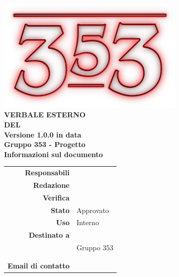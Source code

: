 \documentclass[openany, a4paper, 12pt]{report}
\begin{document}
\begin{titlepage}
	\centering
	\vfill
	{
		\bfseries
		\vskip2cm
		\includegraphics[width=9cm]{../../common/images/logo.png} \\
		\vfill
		\Huge{VERBALE ESTERNO\\DEL {}}\\
		\vfill
		\Large Versione 1.0.0 in data \\
		\large Gruppo 353 - Progetto \progetto \\
		\vfill
		\normalsize Informazioni sul documento\\
		\begin{table}[htbp]
			\centering
			\renewcommand\arraystretch{1.2}
			\begin{tabular}{r|l}
				\hline
				\textbf{Responsabili}	& \Valentina\\
				
				\textbf{Redazione} 		& \Riccardo \\
				\textbf{Verifica} 		&  \Elena\\	
				
				\textbf{Stato} 			& Approvato\\
				\textbf{Uso}			& Interno\\
				\textbf{Destinato a}   	& \Proponente\\
										& Gruppo 353\\
										& \Vardanega\\
										& \Cardin\\

				\textbf{Email di contatto}	& \mailgroup
			\end{tabular}
		\end{table}
		\vfill 
	}    
\end{titlepage}

\tableofcontents
\newpage
{}

 
\end{document}
